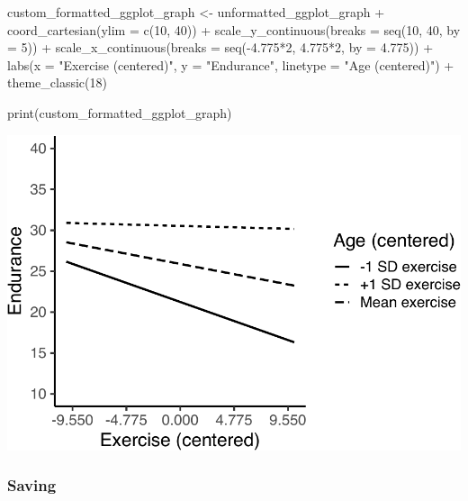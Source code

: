 \documentclass[
]{krantz}
\makeatletter
\newenvironment{Shaded}{\begin{snugshade}}{\end{snugshade}}
\newcommand{\AttributeTok}[1]{\textcolor[rgb]{0.61,0.61,0.61}{#1}}
\newcommand{\DecValTok}[1]{\textcolor[rgb]{0.06,0.06,0.06}{#1}}
\newcommand{\FloatTok}[1]{\textcolor[rgb]{0.06,0.06,0.06}{#1}}
\newcommand{\FunctionTok}[1]{\textcolor[rgb]{0,0,0}{#1}}
\newcommand{\NormalTok}[1]{#1}
\newcommand{\OtherTok}[1]{\textcolor[rgb]{0.37,0.37,0.37}{#1}}
\newcommand{\SpecialCharTok}[1]{\textcolor[rgb]{0,0,0}{#1}}
\newcommand{\StringTok}[1]{\textcolor[rgb]{0.5,0.5,0.5}{#1}}
\newenvironment{kframe}{%
\medskip{}
\setlength{\fboxsep}{.8em}
 \def\at@end@of@kframe{}%
 \ifinner\ifhmode%
  \def\at@end@of@kframe{\end{minipage}}%
  \begin{minipage}{\columnwidth}%
 \fi\fi%
 \def\FrameCommand##1{\hskip\@totalleftmargin \hskip-\fboxsep
 \colorbox{shadecolor}{##1}\hskip-\fboxsep
     \hskip-\linewidth \hskip-\@totalleftmargin \hskip\columnwidth}%
 \MakeFramed {\advance\hsize-\width
   \@totalleftmargin\z@ \linewidth\hsize
   \@setminipage}}%
 {\par\unskip\endMakeFramed%
 \at@end@of@kframe}
\renewenvironment{Shaded}{\begin{kframe}}{\end{kframe}}
\makeatother
\begin{document}
\begin{Shaded}
\begin{Highlighting}[]
\NormalTok{custom\_formatted\_ggplot\_graph }\OtherTok{\textless{}{-}}\NormalTok{ unformatted\_ggplot\_graph }\SpecialCharTok{+}
  \FunctionTok{coord\_cartesian}\NormalTok{(}\AttributeTok{ylim =} \FunctionTok{c}\NormalTok{(}\DecValTok{10}\NormalTok{, }\DecValTok{40}\NormalTok{)) }\SpecialCharTok{+}
  \FunctionTok{scale\_y\_continuous}\NormalTok{(}\AttributeTok{breaks =} \FunctionTok{seq}\NormalTok{(}\DecValTok{10}\NormalTok{, }\DecValTok{40}\NormalTok{, }\AttributeTok{by =} \DecValTok{5}\NormalTok{)) }\SpecialCharTok{+}
  \FunctionTok{scale\_x\_continuous}\NormalTok{(}\AttributeTok{breaks =} \FunctionTok{seq}\NormalTok{(}\SpecialCharTok{{-}}\FloatTok{4.775}\SpecialCharTok{*}\DecValTok{2}\NormalTok{, }\FloatTok{4.775}\SpecialCharTok{*}\DecValTok{2}\NormalTok{, }\AttributeTok{by =} \FloatTok{4.775}\NormalTok{)) }\SpecialCharTok{+}
  \FunctionTok{labs}\NormalTok{(}\AttributeTok{x =} \StringTok{"Exercise (centered)"}\NormalTok{,}
       \AttributeTok{y =} \StringTok{"Endurance"}\NormalTok{,}
       \AttributeTok{linetype =} \StringTok{"Age (centered)"}\NormalTok{) }\SpecialCharTok{+}
  \FunctionTok{theme\_classic}\NormalTok{(}\DecValTok{18}\NormalTok{)}

\FunctionTok{print}\NormalTok{(custom\_formatted\_ggplot\_graph)}
\end{Highlighting}
\end{Shaded}

\includegraphics{bookdown_files/figure-latex/unnamed-chunk-491-1.pdf}

\hypertarget{saving-1}{%
\subsubsection{Saving}\label{saving-1}}
\end{document}
